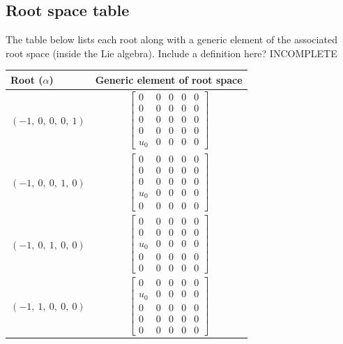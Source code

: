 \documentclass[11pt]{article}
\newcommand{\noi}{\noindent}
\theoremstyle{definition}
\begin{document}
\subsection{Root space table}

\noi The table below lists each root along with a generic element of the associated root space (inside the Lie algebra). Include a definition here? INCOMPLETE

\bigskip

\noindent \begin{tabular}{|l|c|}
    \hline
    \textbf{Root ($\alpha$)} & \textbf{Generic element of root space} \\
    \hline
    $\left( -1, \  0, \  0, \  0, \  1\right)$ & $\left[\begin{matrix}0 & 0 & 0 & 0 & 0\\0 & 0 & 0 & 0 & 0\\0 & 0 & 0 & 0 & 0\\0 & 0 & 0 & 0 & 0\\u_{0} & 0 & 0 & 0 & 0\end{matrix}\right]$ \\
    \hline
    $\left( -1, \  0, \  0, \  1, \  0\right)$ & $\left[\begin{matrix}0 & 0 & 0 & 0 & 0\\0 & 0 & 0 & 0 & 0\\0 & 0 & 0 & 0 & 0\\u_{0} & 0 & 0 & 0 & 0\\0 & 0 & 0 & 0 & 0\end{matrix}\right]$ \\
    \hline
    $\left( -1, \  0, \  1, \  0, \  0\right)$ & $\left[\begin{matrix}0 & 0 & 0 & 0 & 0\\0 & 0 & 0 & 0 & 0\\u_{0} & 0 & 0 & 0 & 0\\0 & 0 & 0 & 0 & 0\\0 & 0 & 0 & 0 & 0\end{matrix}\right]$ \\
    \hline
    $\left( -1, \  1, \  0, \  0, \  0\right)$ & $\left[\begin{matrix}0 & 0 & 0 & 0 & 0\\u_{0} & 0 & 0 & 0 & 0\\0 & 0 & 0 & 0 & 0\\0 & 0 & 0 & 0 & 0\\0 & 0 & 0 & 0 & 0\end{matrix}\right]$ \\

\end{tabular}
\end{document}
